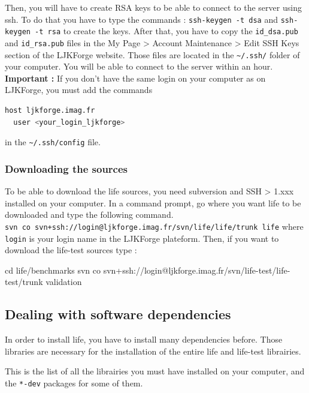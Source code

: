 \documentclass[a4paper]{book}
\begin{document}
Then, you will have to create RSA keys to be able to connect to the server
using ssh. To do that you have to type the commands :
\verb|ssh-keygen -t dsa| and \linebreak[2] \verb|ssh-keygen -t rsa| to create
the keys. After that, you have to copy the \verb|id_dsa.pub| and
\verb|id_rsa.pub| files in the My Page > Account Maintenance > Edit SSH Keys
section of the LJKForge website. Those files are located in the \verb|~/.ssh/|
folder of your computer. You will be able to connect to the server within an
hour.
\\
{\bfseries Important : } If you don't have the same login on your computer as on
LJKForge, you must add the commands
\begin{lstlisting}[language=sh]
host ljkforge.imag.fr
  user <your_login_ljkforge>
\end{lstlisting}
in the \verb|~/.ssh/config| file.

\subsubsection{Downloading the sources}
\label{sec:download-sources}

To be able to download the life sources, you need subversion and SSH > 1.xxx
installed on your computer. In a command prompt, go where you want life to be
downloaded and type the following command.
\\ \verb|svn co svn+ssh://login@ljkforge.imag.fr/svn/life/life/trunk life|
where \\ \verb|login| is your login name in the LJKForge plateform. Then, if
you want to download the life-test sources type :
\begin{unixcom}
  cd life/benchmarks
  svn co svn+ssh://login@ljkforge.imag.fr/svn/life-test/life-test/trunk validation
\end{unixcom}

\subsection{Dealing with software dependencies}
\label{sec:about-dependencies}

In order to install life, you have to install many dependencies before. Those
libraries are necessary for the installation of the entire life and life-test
librairies.

This is the list of all the librairies you must have installed on your
computer, and the \verb|*-dev| packages for some of them.
\end{document}
